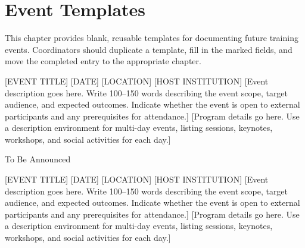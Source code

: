 \chapter{Event Templates}
\label{ch:event-templates}

This chapter provides blank, reusable templates for documenting future training
events.  Coordinators should duplicate a template, fill in the marked fields,
and move the completed entry to the appropriate chapter.

\newpage
\eventpage
  {[EVENT TITLE]}%
  {[DATE]}%
  {[LOCATION]}%
  {[HOST INSTITUTION]}%
  {[Event description goes here.  Write 100--150 words describing the event
    scope, target audience, and expected outcomes.  Indicate whether the event
    is open to external participants and any prerequisites for attendance.]}%
  {[Program details go here.  Use a description environment for multi-day
    events, listing sessions, keynotes, workshops, and social activities for
    each day.]}%
  {}%

\begin{tcolorbox}[colback=mscaLightGrey, colframe=mscaGrey, arc=2mm]
\centering\sffamily\large\color{mscaGrey}
To Be Announced
\end{tcolorbox}

\newpage
\eventpage
  {[EVENT TITLE]}%
  {[DATE]}%
  {[LOCATION]}%
  {[HOST INSTITUTION]}%
  {[Event description goes here.  Write 100--150 words describing the event
    scope, target audience, and expected outcomes.  Indicate whether the event
    is open to external participants and any prerequisites for attendance.]}%
  {[Program details go here.  Use a description environment for multi-day
    events, listing sessions, keynotes, workshops, and social activities for
    each day.]}%
  {}%


